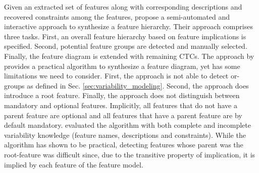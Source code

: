 Given an extracted set of features along with corresponding descriptions and
recovered constraints among the features, \cite{she_reverse_2011} propose a
semi-automated and interactive approach to synthesize a feature hierarchy.
Their approach comprises three tasks. First, an overall feature hierarchy based
on feature implications is specified. Second, potential feature groups are
detected and manually selected. Finally, the feature diagram is extended with
remaining CTCs. 
The approach by \cite{she_reverse_2011} provides a practical algorithm to synthesize a
feature diagram, yet has some limitations we need to consider. First, the
approach is not able to detect or-groups as defined in Sec. \ref{sec:variability_modeling}.
Second, the approach does introduce a root feature. Finally, the approach does not
distinguish between mandatory and optional features. Implicitly, all features
that do not have a parent feature are optional and all features that have a
parent feature are by default mandatory. \cite{she_reverse_2011} evaluated the
algorithm with both complete and incomplete variability knowledge (feature
names, descriptions and constraints). While the algorithm has shown to be
practical, detecting features whose parent was the root-feature was difficult
since, due to the transitive property of implication, it is implied by each
feature of the feature model.

%   

  
